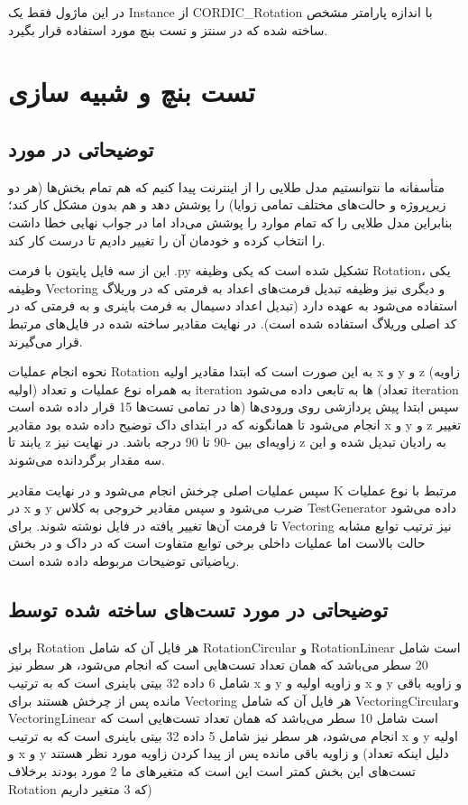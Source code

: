\documentclass[12pt,titlepage,a4page , tikz , multi,table , svgnames,xcdraw]{article}
\begin{document}
در این ماژول فقط یک Instance از CORDIC\_Rotation با اندازه پارامتر مشخص ساخته شده که در سنتز و تست بنچ مورد استفاده قرار بگیرد.


\newpage


\section{تست بنچ و شبیه سازی}

\subsection{توضیحاتی در مورد }

متأسفانه ما نتوانستیم مدل طلایی را از اینترنت پیدا کنیم که هم تمام بخش‌ها (هر دو زیرپروژه و حالت‌های مختلف تمامی زوایا) را پوشش دهد و هم بدون مشکل کار کند؛ بنابراین مدل طلایی را که تمام موارد را پوشش می‌داد اما در جواب نهایی خطا داشت را انتخاب کرده و خودمان آن را تغییر دادیم تا درست کار کند.

این  از سه فایل پایتون با فرمت .py تشکیل شده است که یکی وظیفه Rotation، یکی وظیفه Vectoring و دیگری نیز وظیفه تبدیل فرمت‌های اعداد به فرمتی که در وریلاگ استفاده می‌شود به عهده دارد (تبدیل اعداد دسیمال به فرمت باینری و به فرمتی که در کد اصلی وریلاگ استفاده شده است). در نهایت مقادیر ساخته شده در فایل‌های مرتبط قرار می‌گیرند.

نحوه انجام عملیات Rotation به این صورت است که ابتدا مقادیر اولیه x و y و z (زاویه اولیه) به همراه نوع عملیات و تعداد iteration ها به تابعی داده می‌شود (تعداد iteration ها در تمامی تست‌ها 15  قرار داده شده است) سپس ابتدا پیش پردازشی روی ورودی‌ها انجام می‌شود تا همانگونه که در ابتدای داک توضیح داده شده بود مقادیر x و y و z تغییر یابند تا z زاویه‌ای بین -90 تا 90 درجه باشد. در نهایت نیز z به رادیان تبدیل شده و این سه مقدار برگردانده می‌شوند.

سپس عملیات اصلی چرخش انجام می‌شود و در نهایت مقادیر K مرتبط با نوع عملیات در x و y ضرب می‌شود و سپس مقادیر خروجی به کلاس TestGenerator داده می‌شود تا فرمت آن‌ها تغییر یافته در فایل نوشته شوند.
برای Vectoring نیز ترتیب توابع مشابه حالت بالاست اما عملیات داخلی برخی توابع متفاوت است که در داک و در بخش ریاضیاتی توضیحات مربوطه داده شده است.

\subsection{توضیحاتی در مورد تست‌های ساخته شده توسط }

برای Rotation هر فایل آن که شامل RotationCircular و RotationLinear است شامل 20 سطر می‌باشد که همان تعداد تست‌هایی است که انجام می‌شود، هر سطر نیز شامل 6 داده 32 بیتی باینری است که به ترتیب x و y و زاویه اولیه و x و y و زاویه باقی مانده پس از چرخش هستند
برای  Vectoring هر فایل آن که شامل VectoringCircularو VectoringLinear است شامل 10 سطر می‌باشد که همان تعداد تست‌هایی است که انجام می‌شود، هر سطر نیز شامل 5 داده 32 بیتی باینری است که به ترتیب x و y اولیه و x و y و زاویه باقی مانده پس از پیدا کردن زاویه مورد نظر هستند (دلیل اینکه تعداد تست‌های این بخش کمتر است این است که متغیرهای ما 2 مورد بودند برخلاف Rotation که 3 متغیر داریم)
\end{document}
